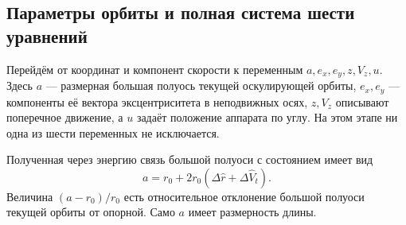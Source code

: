 \documentclass[a4paper,11pt]{article}
\numberwithin{equation}{section}
\theoremstyle{remark}
\begin{document}
\subsection{Параметры орбиты и полная система шести уравнений}
\label{sec:orbital-variables}

Перейдём от координат и компонент скорости к переменным
$a,e_x,e_y,z,V_z,u$. Здесь $a$ --- размерная большая полуось
текущей оскулирующей орбиты, $e_x,e_y$ --- компоненты её вектора
эксцентриситета в неподвижных осях, $z,V_z$ описывают поперечное
движение, а $u$ задаёт положение аппарата по углу.
На этом этапе ни одна из шести переменных не исключается.

Полученная через энергию связь большой полуоси с состоянием имеет вид
\begin{equation}
 \boxed{a=r_0+2r_0(\Delta\widehat r+\Delta\widehat V_t).}
 \label{eq:semimajor-state}
\end{equation}
Величина $(a-r_0)/r_0$ есть относительное отклонение большой
полуоси текущей орбиты от опорной. Само $a$ имеет размерность длины.
\end{document}
